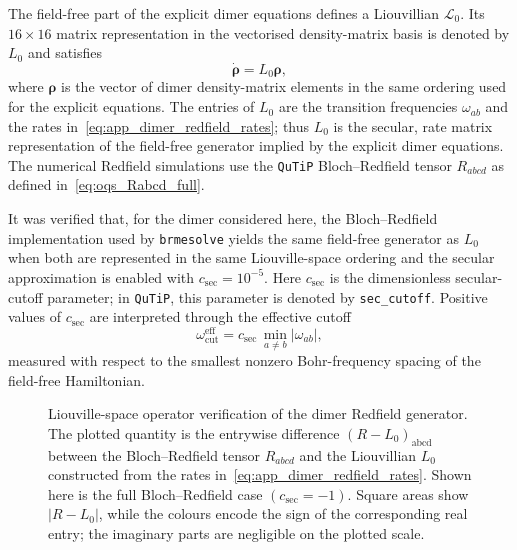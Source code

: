 The field-free part of the explicit dimer equations defines a
Liouvillian \(\mathcal{L}_0\). Its \(16\times16\) matrix representation in the
vectorised density-matrix basis is denoted by \(L_0\) and satisfies
\begin{equation*}
\dot{\boldsymbol{\rho}}=L_0\boldsymbol{\rho},
\end{equation*}
where \(\boldsymbol{\rho}\) is the vector of dimer density-matrix elements in
the same ordering used for the explicit equations. The entries of \(L_0\) are
the transition frequencies \(\omega_{ab}\) and the rates
in~\autoref{eq:app_dimer_redfield_rates}; thus \(L_0\) is the secular,
rate matrix representation of the field-free generator implied by the
explicit dimer equations. The numerical
Redfield simulations use the
\texttt{QuTiP} Bloch--Redfield tensor \(R_{abcd}\) as defined in~\autoref{eq:oqs_Rabcd_full}.

It was verified that, for the dimer considered here, the
Bloch--Redfield implementation used by \texttt{brmesolve} yields the same
field-free generator as \(L_0\) when both are represented in the same
Liouville-space ordering and the secular approximation is enabled with
\(c_{\mathrm{sec}} = 10^{-5}\). Here \(c_{\mathrm{sec}}\) is the dimensionless
secular-cutoff parameter; in \texttt{QuTiP}, this parameter is denoted by
\texttt{sec\_cutoff}. Positive values of \(c_{\mathrm{sec}}\) are interpreted
through the effective cutoff
\begin{equation*}
    \omega_{\mathrm{cut}}^{\mathrm{eff}}
    =
    c_{\mathrm{sec}}\,\min_{a\neq b}\left|\omega_{ab}\right|,
\end{equation*}
measured with respect to the smallest nonzero Bohr-frequency spacing of the
field-free Hamiltonian.

\begin{figure}[htbp]
    \centering
    \caption{Liouville-space operator verification of the dimer Redfield generator. The
    plotted quantity is the entrywise difference \((R-L_0)_{\mathrm{abcd}}\) between the
    Bloch--Redfield tensor \(R_{abcd}\) and
    the Liouvillian \(L_0\) constructed from the rates
    in~\autoref{eq:app_dimer_redfield_rates}. Shown here is the full
    Bloch--Redfield case \((c_{\mathrm{sec}} = -1)\). Square areas show
    \(|R-L_0|\), while the colours encode the sign of the corresponding real entry; the
    imaginary parts are negligible on the plotted scale.}
    \label{fig:app_dimer_redfield_tensor_difference_focus}
\end{figure}

